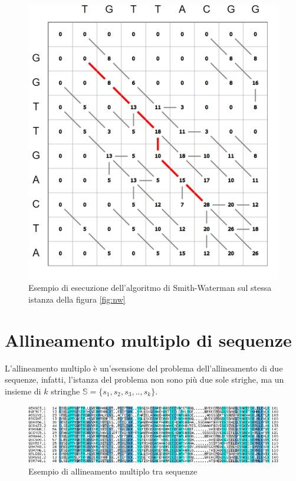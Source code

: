 \begin{figure}[ht]
    \centering
    \includegraphics[scale=0.45]{images/esempio sw.PNG}
    \caption{Esempio di esecuzione dell'algoritmo di Smith-Waterman sul stessa istanza della figura \ref{fig:nw}}
    \label{fig:sw}
\end{figure}

\section{Allineamento multiplo di sequenze}

L'allineamento multiplo è un'esensione del problema dell'allineamento di due sequenze, infatti, l'istanza del problema non sono più due sole strighe, ma un insieme di $k$ stringhe $\mathbb{S}=\{s_1,s_2,s_3,..,s_k\}$.

\begin{figure}
    \centering
    \includegraphics[scale=0.5]{images/multiple sequence alignment.png}
    \caption{Esempio di allineamento multiplo tra sequenze}
    \label{fig:mul_al}
\end{figure}

